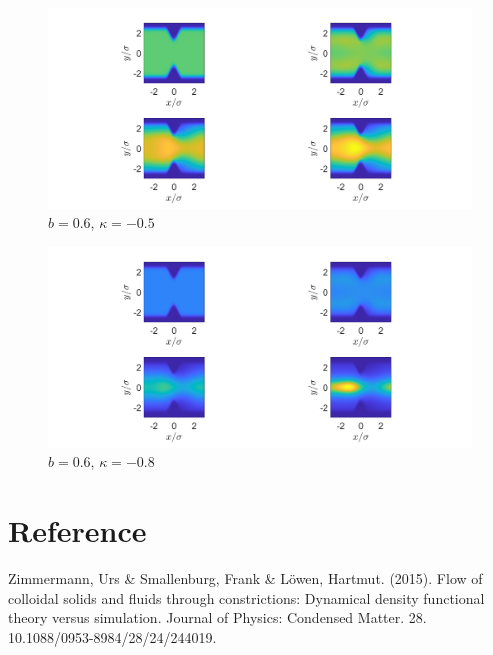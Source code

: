 \documentclass[11pt, a4paper]{article}
\theoremstyle{definition}
\begin{document}
\begin{figure}[h]
	\centering
	\includegraphics[scale=0.4]{ConFa3.png}
	\caption{$b = 0.6$, $\kappa = -0.5$} 
	\label{F3c}
\end{figure}
\begin{figure}[h]
	\centering
	\includegraphics[scale=0.4]{ConFa4.png}
	\caption{$b = 0.6$, $\kappa = -0.8$} 
	\label{F3d}
\end{figure}

\section{Reference}
Zimmermann, Urs \& Smallenburg, Frank \& Löwen, Hartmut. (2015). Flow of colloidal solids and fluids through constrictions: Dynamical density functional theory versus simulation. Journal of Physics: Condensed Matter. 28. 10.1088/0953-8984/28/24/244019. 	
	
\end{document}
